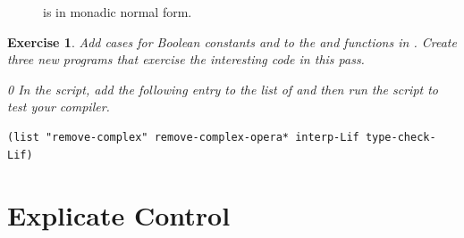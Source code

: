 \documentclass[7x10,nocrop]{TimesAPriori_MIT}%
\newcommand{\gray}[1]{{\color{gray} #1}}
\def\racketEd{0}
\def\pythonEd{1}
\def\edition{1}
\newtheorem{exercise}[theorem]{Exercise}
\begin{document}
\begin{figure}[tp]
\centering
\fbox{
\begin{minipage}{0.96\textwidth}
{\if\edition\racketEd    
\[
\begin{array}{rcl}
Atm &::=& \gray{ \INT{\Int} \MID \VAR{\Var} } \MID \BOOL{\itm{bool}}\\
\Exp &::=& \gray{ \Atm \MID \READ{} } \\
     &\MID& \gray{ \NEG{\Atm} \MID \ADD{\Atm}{\Atm} } \\
     &\MID& \gray{ \LET{\Var}{\Exp}{\Exp} } \\
     &\MID& \UNIOP{\key{not}}{\Atm} \\
      &\MID& \BINOP{\itm{cmp}}{\Atm}{\Atm} \MID \IF{\Exp}{\Exp}{\Exp} \\
\LangIfANF  &::=& \PROGRAM{\code{()}}{\Exp}
\end{array}
\]
\fi}
{\if\edition\pythonEd
\[
\begin{array}{l}
  \gray{\LvarMonadASTPython} \\ \hline
  \LifMonadASTPython \\
   \begin{array}{rcl}
     \LangIfANF  &::=& \PROGRAM{\code{()}}{\Stmt^{*}}
   \end{array}
\end{array}
\]
\fi}
\end{minipage}
}
\caption{\LangIfANF{} is \LangIf{} in monadic normal form.}
\label{fig:Lif-anf-syntax}
\end{figure}


\begin{exercise}\normalfont
%
Add cases for Boolean constants and  to the 
and  functions in .
%
Create three new \LangIf{} programs that exercise the interesting
code in this pass.
%
{\if\edition\racketEd    
In the  script, add the following entry to the
list of  and then run the script to test your compiler.
\begin{lstlisting}
(list "remove-complex" remove-complex-opera* interp-Lif type-check-Lif)
\end{lstlisting}
\fi}
\end{exercise}


\section{Explicate Control}
\label{sec:explicate-control-Lif}
\end{document}
